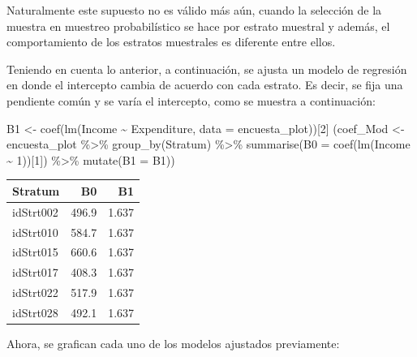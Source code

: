 \documentclass[
  12pt,
]{book}
\newenvironment{Shaded}{\begin{snugshade}}{\end{snugshade}}
\newcommand{\AttributeTok}[1]{\textcolor[rgb]{0.77,0.63,0.00}{#1}}
\newcommand{\DecValTok}[1]{\textcolor[rgb]{0.00,0.00,0.81}{#1}}
\newcommand{\FunctionTok}[1]{\textcolor[rgb]{0.00,0.00,0.00}{#1}}
\newcommand{\NormalTok}[1]{#1}
\newcommand{\OtherTok}[1]{\textcolor[rgb]{0.56,0.35,0.01}{#1}}
\newcommand{\SpecialCharTok}[1]{\textcolor[rgb]{0.00,0.00,0.00}{#1}}
\begin{document}
Naturalmente este supuesto no es válido más aún, cuando la selección de la muestra en muestreo probabilístico se hace por estrato muestral y además, el comportamiento de los estratos muestrales es diferente entre ellos.

Teniendo en cuenta lo anterior, a continuación, se ajusta un modelo de regresión en donde el intercepto cambia de acuerdo con cada estrato. Es decir, se fija una pendiente común y se varía el intercepto, como se muestra a continuación:

\begin{Shaded}
\begin{Highlighting}[]
\NormalTok{B1 }\OtherTok{\textless{}{-}} \FunctionTok{coef}\NormalTok{(}\FunctionTok{lm}\NormalTok{(Income }\SpecialCharTok{\textasciitilde{}}\NormalTok{ Expenditure, }\AttributeTok{data =}\NormalTok{ encuesta\_plot))[}\DecValTok{2}\NormalTok{]}
\NormalTok{(coef\_Mod }\OtherTok{\textless{}{-}}\NormalTok{ encuesta\_plot }\SpecialCharTok{\%\textgreater{}\%} \FunctionTok{group\_by}\NormalTok{(Stratum) }\SpecialCharTok{\%\textgreater{}\%} 
  \FunctionTok{summarise}\NormalTok{(}\AttributeTok{B0 =} \FunctionTok{coef}\NormalTok{(}\FunctionTok{lm}\NormalTok{(Income }\SpecialCharTok{\textasciitilde{}} \DecValTok{1}\NormalTok{))[}\DecValTok{1}\NormalTok{]) }\SpecialCharTok{\%\textgreater{}\%} 
  \FunctionTok{mutate}\NormalTok{(}\AttributeTok{B1 =}\NormalTok{ B1))}
\end{Highlighting}
\end{Shaded}

\begin{tabular}{l|r|r}
\hline
Stratum & B0 & B1\\
\hline
idStrt002 & 496.9 & 1.637\\
\hline
idStrt010 & 584.7 & 1.637\\
\hline
idStrt015 & 660.6 & 1.637\\
\hline
idStrt017 & 408.3 & 1.637\\
\hline
idStrt022 & 517.9 & 1.637\\
\hline
idStrt028 & 492.1 & 1.637\\
\hline
\end{tabular}

Ahora, se grafican cada uno de los modelos ajustados previamente:
\end{document}
